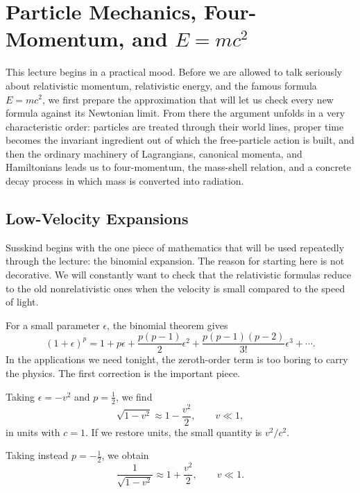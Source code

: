 \chapter{Particle Mechanics, Four-Momentum, and \(E=mc^2\)}

This lecture begins in a practical mood. Before we are allowed to talk seriously about relativistic momentum, relativistic energy, and the famous formula \(E=mc^2\), we first prepare the approximation that will let us check every new formula against its Newtonian limit. From there the argument unfolds in a very characteristic order: particles are treated through their world lines, proper time becomes the invariant ingredient out of which the free-particle action is built, and then the ordinary machinery of Lagrangians, canonical momenta, and Hamiltonians leads us to four-momentum, the mass-shell relation, and a concrete decay process in which mass is converted into radiation.

\section{Low-Velocity Expansions}

Susskind begins with the one piece of mathematics that will be used repeatedly through the lecture: the binomial expansion. The reason for starting here is not decorative. We will constantly want to check that the relativistic formulas reduce to the old nonrelativistic ones when the velocity is small compared to the speed of light.

For a small parameter \(\epsilon\), the binomial theorem gives
\begin{equation}
(1+\epsilon)^p
=
1+p\epsilon+\frac{p(p-1)}{2}\epsilon^2+\frac{p(p-1)(p-2)}{3!}\epsilon^3+\cdots.
\end{equation}
In the applications we need tonight, the zeroth-order term is too boring to carry the physics. The first correction is the important piece.

Taking \(\epsilon=-v^2\) and \(p=\tfrac12\), we find
\begin{equation}
\sqrt{1-v^2}\approx 1-\frac{v^2}{2},
\qquad v\ll 1,
\end{equation}
in units with \(c=1\). If we restore units, the small quantity is \(v^2/c^2\).

Taking instead \(p=-\tfrac12\), we obtain
\begin{equation}
\frac{1}{\sqrt{1-v^2}}
\approx
1+\frac{v^2}{2},
\qquad v\ll 1.
\end{equation}

